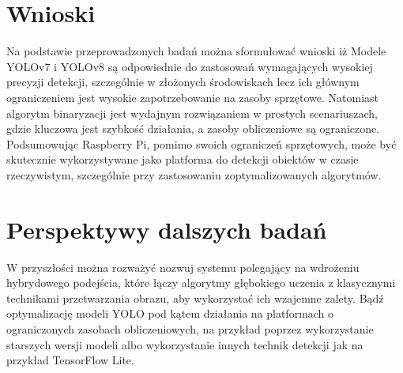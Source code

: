 \documentclass[a4paper,twoside,12pt]{book}
\begin{document}
\section{Wnioski}
Na podstawie przeprowadzonych badań można sformułować wnioski iż Modele YOLOv7 i YOLOv8 są odpowiednie do zastosowań wymagających wysokiej precyzji detekcji, szczególnie w złożonych środowiskach lecz ich głównym ograniczeniem jest wysokie zapotrzebowanie na zasoby sprzętowe. 
Natomiast algorytm binaryzacji jest wydajnym rozwiązaniem w prostych scenariuszach, gdzie kluczowa jest szybkość działania, a zasoby obliczeniowe są ograniczone. 
Podsumowując Raspberry Pi, pomimo swoich ograniczeń sprzętowych, może być skutecznie wykorzystywane jako platforma do detekcji obiektów w czasie rzeczywistym, szczególnie przy zastosowaniu zoptymalizowanych algorytmów.

\section{Perspektywy dalszych badań}
W przyszłości można rozważyć nozwuj systemu polegający na wdrożeniu hybrydowego podejścia, które łączy algorytmy głębokiego uczenia z klasycznymi technikami przetwarzania obrazu, aby wykorzystać ich wzajemne zalety. Bądź optymalizację modeli YOLO pod kątem działania na platformach o ograniczonych zasobach obliczeniowych, na przykład poprzez wykorzystanie starszych wersji modeli albo wykorzystanie innych technik detekcji jak na przykład TensorFlow Lite. 









\backmatter

\printbibliography           %
\end{document}
